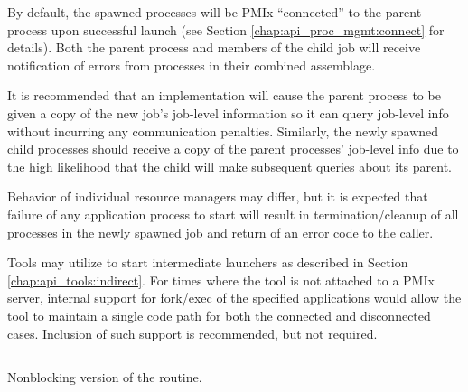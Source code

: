 By default, the spawned processes will be PMIx ``connected'' to the parent process upon successful launch (see Section \ref{chap:api_proc_mgmt:connect}
for details).
Both the parent process and members of the child job will receive notification of errors from processes in their combined assemblage.

\advicermstart
It is recommended that an implementation will cause the parent process to be given a copy of the new job's job-level
information so it can query job-level info without incurring any communication penalties.  Similarly, the newly
spawned child processes should receive a copy of the parent processes' job-level info due to the high likelihood
that the child will make subsequent queries about its parent.
\advicermend

\adviceuserstart
Behavior of individual resource managers may differ, but it is expected that failure of any application process to start will result in termination/cleanup of all processes in the newly spawned job and return of an error code to the caller.
\adviceuserend

\adviceimplstart
Tools may utilize  to start intermediate launchers as described in Section \ref{chap:api_tools:indirect}. For times where the tool is not attached to a \ac{PMIx} server, internal support for fork/exec of the specified applications would allow the tool to maintain a single code path for both the connected and disconnected cases. Inclusion of such support is recommended, but not required.
\adviceimplend


\subsection{}

\summary

Nonblocking version of the  routine.

\format


